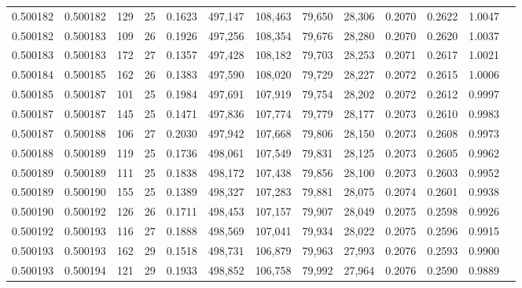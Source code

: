 \begin{tabular}{rrrrrrrrrrrrr}
0.500182 & 0.500182 & 129 &  25 &                                     0.1623 & 497,147 & 108,463 &  79,650 &  28,306 & 0.2070 & 0.2622 & 1.0047 \\
0.500182 & 0.500183 & 109 &  26 &                                     0.1926 & 497,256 & 108,354 &  79,676 &  28,280 & 0.2070 & 0.2620 & 1.0037 \\
0.500183 & 0.500183 & 172 &  27 &                                     0.1357 & 497,428 & 108,182 &  79,703 &  28,253 & 0.2071 & 0.2617 & 1.0021 \\
0.500184 & 0.500185 & 162 &  26 &                                     0.1383 & 497,590 & 108,020 &  79,729 &  28,227 & 0.2072 & 0.2615 & 1.0006 \\
0.500185 & 0.500187 & 101 &  25 &                                     0.1984 & 497,691 & 107,919 &  79,754 &  28,202 & 0.2072 & 0.2612 & 0.9997 \\
0.500187 & 0.500187 & 145 &  25 &                                     0.1471 & 497,836 & 107,774 &  79,779 &  28,177 & 0.2073 & 0.2610 & 0.9983 \\
0.500187 & 0.500188 & 106 &  27 &                                     0.2030 & 497,942 & 107,668 &  79,806 &  28,150 & 0.2073 & 0.2608 & 0.9973 \\
0.500188 & 0.500189 & 119 &  25 &                                     0.1736 & 498,061 & 107,549 &  79,831 &  28,125 & 0.2073 & 0.2605 & 0.9962 \\
0.500189 & 0.500189 & 111 &  25 &                                     0.1838 & 498,172 & 107,438 &  79,856 &  28,100 & 0.2073 & 0.2603 & 0.9952 \\
0.500189 & 0.500190 & 155 &  25 &                                     0.1389 & 498,327 & 107,283 &  79,881 &  28,075 & 0.2074 & 0.2601 & 0.9938 \\
0.500190 & 0.500192 & 126 &  26 &                                     0.1711 & 498,453 & 107,157 &  79,907 &  28,049 & 0.2075 & 0.2598 & 0.9926 \\
0.500192 & 0.500193 & 116 &  27 &                                     0.1888 & 498,569 & 107,041 &  79,934 &  28,022 & 0.2075 & 0.2596 & 0.9915 \\
0.500193 & 0.500193 & 162 &  29 &                                     0.1518 & 498,731 & 106,879 &  79,963 &  27,993 & 0.2076 & 0.2593 & 0.9900 \\
0.500193 & 0.500194 & 121 &  29 &                                     0.1933 & 498,852 & 106,758 &  79,992 &  27,964 & 0.2076 & 0.2590 & 0.9889 \\

\end{tabular}
